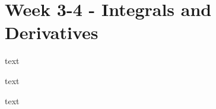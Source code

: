 \documentclass[../main.tex]{subfiles}
\begin{document}
\section{Week 3-4 - Integrals and Derivatives}

text

text

text
\end{document}
